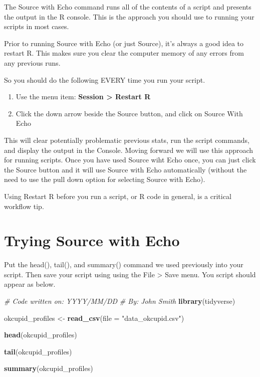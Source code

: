 \documentclass[
]{krantz}
\makeatletter
\newenvironment{Shaded}{\begin{snugshade}}{\end{snugshade}}
\newcommand{\CommentTok}[1]{\textcolor[rgb]{0.37,0.37,0.37}{\textit{#1}}}
\newcommand{\DataTypeTok}[1]{\textcolor[rgb]{0.27,0.27,0.27}{#1}}
\newcommand{\KeywordTok}[1]{\textcolor[rgb]{0.27,0.27,0.27}{\textbf{#1}}}
\newcommand{\NormalTok}[1]{#1}
\newcommand{\StringTok}[1]{\textcolor[rgb]{0.5,0.5,0.5}{#1}}
\providecommand{\tightlist}{%
  \setlength{\itemsep}{0pt}\setlength{\parskip}{0pt}}
\newenvironment{kframe}{%
\medskip{}
\setlength{\fboxsep}{.8em}
 \def\at@end@of@kframe{}%
 \ifinner\ifhmode%
  \def\at@end@of@kframe{\end{minipage}}%
  \begin{minipage}{\columnwidth}%
 \fi\fi%
 \def\FrameCommand##1{\hskip\@totalleftmargin \hskip-\fboxsep
 \colorbox{shadecolor}{##1}\hskip-\fboxsep
     \hskip-\linewidth \hskip-\@totalleftmargin \hskip\columnwidth}%
 \MakeFramed {\advance\hsize-\width
   \@totalleftmargin\z@ \linewidth\hsize
   \@setminipage}}%
 {\par\unskip\endMakeFramed%
 \at@end@of@kframe}
\newenvironment{rmdblock}[1]
  {
  \begin{itemize}
  \renewcommand{\labelitemi}{
    \raisebox{-.7\height}[0pt][0pt]{
      {\setkeys{Gin}{width=3em,keepaspectratio}\texttt{[image: images/\#1]}}
    }
  }
  \setlength{\fboxsep}{1em}
  \begin{kframe}
  \item
  }
  {
  \end{kframe}
  \end{itemize}
  }
\newenvironment{rmdcaution}
  {\begin{rmdblock}{caution}}
  {\end{rmdblock}}
\renewenvironment{Shaded}{\begin{kframe}}{\end{kframe}}
\makeatother
\begin{document}
The Source with Echo command runs all of the contents of a script and presents the output in the R console. This is the approach you should use to running your scripts in most cases.

Prior to running Source with Echo (or just Source), it's always a good idea to restart R. This makes sure you clear the computer memory of any errors from any previous runs.

So you should do the following EVERY time you run your script.

\begin{enumerate}
\def\labelenumi{\arabic{enumi}.}
\tightlist
\item
  Use the menu item: \textbf{Session \textgreater{} Restart R}
\item
  Click the down arrow beside the Source button, and click on Source With Echo
\end{enumerate}

This will clear potentially problematic previous stats, run the script commands, and display the output in the Console. Moving forward we will use this approach for running scripts. Once you have used Source wiht Echo once, you can just click the Source button and it will use Source with Echo automatically (without the need to use the pull down option for selecting Source with Echo).

\begin{rmdcaution}
\begin{rmdcaution}

Using Restart R before you run a script, or R code in general, is a critical workflow tip.

\end{rmdcaution}
\end{rmdcaution}

\hypertarget{trying-source-with-echo}{%
\section{Trying Source with Echo}\label{trying-source-with-echo}}

Put the head(), tail(), and summary() command we used previously into your script. Then save your script using using the File \textgreater{} Save menu. You script should appear as below.

\begin{Shaded}
\begin{Highlighting}[]
\CommentTok{# Code written on: YYYY/MM/DD }
\CommentTok{# By: John Smith}
\KeywordTok{library}\NormalTok{(tidyverse)}

\NormalTok{okcupid_profiles <-}\StringTok{ }\KeywordTok{read_csv}\NormalTok{(}\DataTypeTok{file =} \StringTok{"data_okcupid.csv"}\NormalTok{)}

\KeywordTok{head}\NormalTok{(okcupid_profiles)}

\KeywordTok{tail}\NormalTok{(okcupid_profiles)}

\KeywordTok{summary}\NormalTok{(okcupid_profiles)}
\end{Highlighting}
\end{Shaded}
\end{document}
